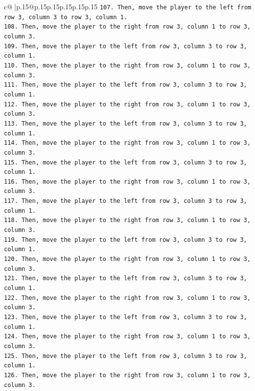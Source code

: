\documentclass{article}
\begin{document}
{\begin{supertabular}{c@{$\;$}|p{.15\linewidth}@{}p{.15\linewidth}p{.15\linewidth}p{.15\linewidth}p{.15\linewidth}p{.15\linewidth}}
{{{\texttt{107. Then, move the player to the left from row 3, column 3 to row 3, column 1.} \\
\texttt{108. Then, move the player to the right from row 3, column 1 to row 3, column 3.} \\
\texttt{109. Then, move the player to the left from row 3, column 3 to row 3, column 1.} \\
\texttt{110. Then, move the player to the right from row 3, column 1 to row 3, column 3.} \\
\texttt{111. Then, move the player to the left from row 3, column 3 to row 3, column 1.} \\
\texttt{112. Then, move the player to the right from row 3, column 1 to row 3, column 3.} \\
\texttt{113. Then, move the player to the left from row 3, column 3 to row 3, column 1.} \\
\texttt{114. Then, move the player to the right from row 3, column 1 to row 3, column 3.} \\
\texttt{115. Then, move the player to the left from row 3, column 3 to row 3, column 1.} \\
\texttt{116. Then, move the player to the right from row 3, column 1 to row 3, column 3.} \\
\texttt{117. Then, move the player to the left from row 3, column 3 to row 3, column 1.} \\
\texttt{118. Then, move the player to the right from row 3, column 1 to row 3, column 3.} \\
\texttt{119. Then, move the player to the left from row 3, column 3 to row 3, column 1.} \\
\texttt{120. Then, move the player to the right from row 3, column 1 to row 3, column 3.} \\
\texttt{121. Then, move the player to the left from row 3, column 3 to row 3, column 1.} \\
\texttt{122. Then, move the player to the right from row 3, column 1 to row 3, column 3.} \\
\texttt{123. Then, move the player to the left from row 3, column 3 to row 3, column 1.} \\
\texttt{124. Then, move the player to the right from row 3, column 1 to row 3, column 3.} \\
\texttt{125. Then, move the player to the left from row 3, column 3 to row 3, column 1.} \\
\texttt{126. Then, move the player to the right from row 3, column 1 to row 3, column 3.} \\
}}}
\end{supertabular}}
\end{document}
